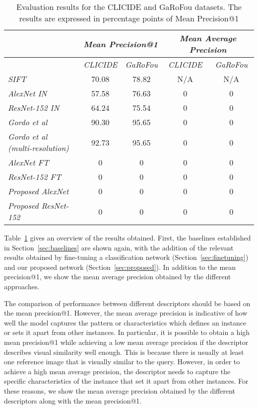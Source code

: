 \begin{table}
\begin{tabular}{|l|c|c|c|c|}
\hline & \multicolumn{2}{c|}{\emph{Mean Precision@1}} &
\multicolumn{2}{c|}{\emph{Mean Average Precision}}\\
\hline & \emph{CLICIDE} & \emph{GaRoFou} & \emph{CLICIDE} & \emph{GaRoFou}\\
\hline \emph{SIFT} & 70.08 & 78.82 & N/A & N/A\\
\hline \emph{AlexNet IN} & 57.58 & 76.63 & 0 & 0\\
\hline \emph{ResNet-152 IN} & 64.24 & 75.54 & 0 & 0\\
\hline \emph{Gordo et al~\cite{gordo_deep_2016}}
& 90.30 & 95.65 & 0 & 0\\
\hline \emph{Gordo et al~\cite{gordo_deep_2016} (multi-resolution)}
& 92.73 & 95.65 & 0 & 0\\
\hline \emph{AlexNet FT} & 0 & 0 & 0 & 0\\ %
\hline \emph{ResNet-152 FT} & 0 & 0 & 0 & 0\\
\hline \emph{Proposed AlexNet} & 0 & 0 & 0 & 0\\ %
\hline \emph{Proposed ResNet-152} & 0 & 0 & 0 & 0\\
\hline
\end{tabular}
\caption{Evaluation results for the CLICIDE and GaRoFou datasets.
The results are expressed in percentage points of
Mean Precision@1\label{tab:results}}
\end{table}

Table~\ref{tab:results} gives an overview of the results obtained. First,
the baselines established in Section~\ref{sec:baselines} are shown
again, with the addition of the relevant results obtained by fine-tuning
a classification network (Section~\ref{sec:finetuning}) and our
proposed network (Section~\ref{sec:proposed}).
In addition to the mean precision@1, we show the mean average
precision obtained by the different approaches.

The comparison of performance between different descriptors should
be based on the mean precision@1. However, the mean average
precision is indicative of how well the model
captures the pattern or characteristics which defines an instance or
sets it apart from other instances. In particular, it is possible to obtain
a high mean precision@1 while achieving a low mean average precision
if the descriptor describes visual similarity well enough. This is because
there is usually at least one reference image that is visually similar
to the query. However, in order to achieve a high mean average precision,
the descriptor needs to capture the specific characteristics of the
instance that set it apart from other instances. For these reasons,
we show the mean average precision obtained by the different
descriptors along with the mean precision@1.

